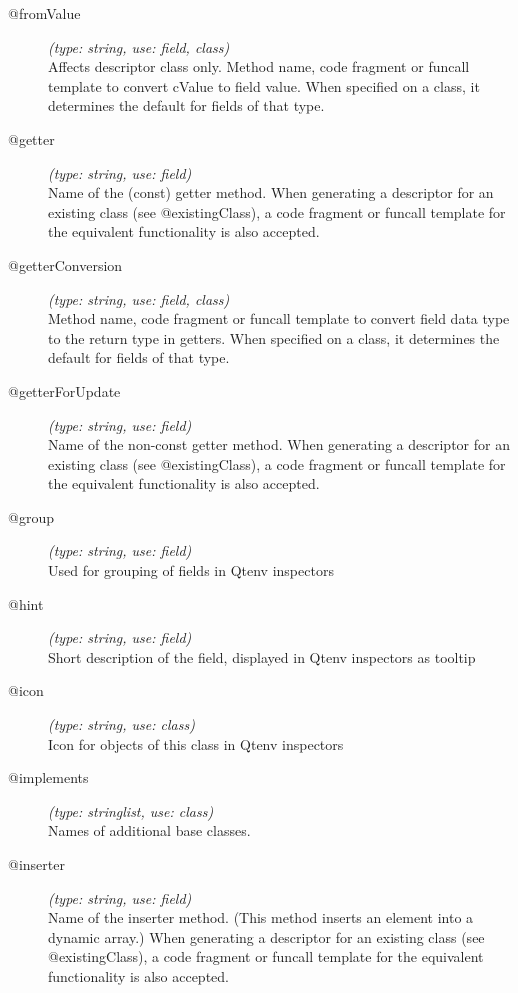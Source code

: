 \begin{description}
\item[@fromValue] \textit{(type: string, use: field, class)} \\
  Affects descriptor class only. Method name, code fragment or funcall
  template to convert cValue to field value. When specified on a class, it
  determines the default for fields of that type.

\item[@getter] \textit{(type: string, use: field)} \\
  Name of the (const) getter method. When generating a descriptor for an
  existing class (see @existingClass), a code fragment or funcall template for
  the equivalent functionality is also accepted.

\item[@getterConversion] \textit{(type: string, use: field, class)} \\
  Method name, code fragment or funcall template to convert field data type to
  the return type in getters. When specified on a class, it determines the
  default for fields of that type.

\item[@getterForUpdate] \textit{(type: string, use: field)} \\
  Name of the non-const getter method. When generating a descriptor for an
  existing class (see @existingClass), a code fragment or funcall template for
  the equivalent functionality is also accepted.

\item[@group] \textit{(type: string, use: field)} \\
  Used for grouping of fields in Qtenv inspectors

\item[@hint] \textit{(type: string, use: field)} \\
  Short description of the field, displayed in Qtenv inspectors as tooltip

\item[@icon] \textit{(type: string, use: class)} \\
  Icon for objects of this class in Qtenv inspectors

\item[@implements] \textit{(type: stringlist, use: class)} \\
  Names of additional base classes.

\item[@inserter] \textit{(type: string, use: field)} \\
  Name of the inserter method. (This method inserts an element into a dynamic
  array.) When generating a descriptor for an existing class (see
  @existingClass), a code fragment or funcall template for the equivalent
  functionality is also accepted.


\end{description}
